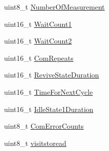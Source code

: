 \begin{DoxyCompactItemize}
\item 
uint8\-\_\-t \hyperlink{structi2c__sensor__struct_ab34ec9d3dc7b6892fb6320f7d4f8ad91}{Number\-Of\-Measurement}
\item 
uint16\-\_\-t \hyperlink{structi2c__sensor__struct_a2825f6177b0df344143181d18e1ac249}{Wait\-Count1}
\item 
uint16\-\_\-t \hyperlink{structi2c__sensor__struct_a7dc7691c63a244df47970dcc62e04fd6}{Wait\-Count2}
\item 
uint16\-\_\-t \hyperlink{structi2c__sensor__struct_ac0c117558f105e569de3c5d34a3d18d9}{Com\-Repeats}
\item 
uint16\-\_\-t \hyperlink{structi2c__sensor__struct_a2eba87600a92380090f4ebe4b9358c55}{Revive\-State\-Duration}
\item 
uint16\-\_\-t \hyperlink{structi2c__sensor__struct_ad76684862532a553add650a6a7d82165}{Time\-For\-Next\-Cycle}
\item 
uint16\-\_\-t \hyperlink{structi2c__sensor__struct_a89f2543f08f41a1a4e9d9f2021150e33}{Idle\-State1\-Duration}
\item 
uint8\-\_\-t \hyperlink{structi2c__sensor__struct_ad285dbe48014bc48d9235787793cd6bf}{Com\-Error\-Counts}
\item 
uint8\-\_\-t \hyperlink{structi2c__sensor__struct_ac0a02a2e50437d7381e0d9dd84036739}{visitstoread}
\end{DoxyCompactItemize}


